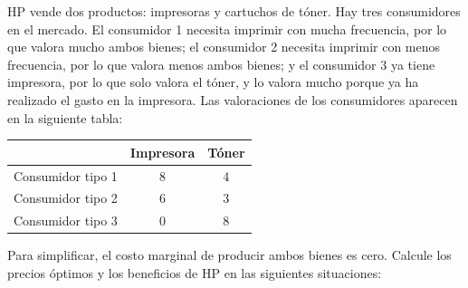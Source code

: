 \question HP vende dos productos: impresoras y cartuchos de tóner. Hay tres consumidores en el mercado. El consumidor 1 necesita imprimir con mucha frecuencia, por lo que valora mucho ambos bienes; el consumidor 2 necesita imprimir con menos frecuencia, por lo que valora menos ambos bienes; y el consumidor 3 ya tiene impresora, por lo que solo valora el tóner, y lo valora mucho porque ya ha realizado el gasto en la impresora. Las valoraciones de los consumidores aparecen en la siguiente tabla:
\begin{center}
\begin{tabular}{lcc}
  & Impresora & Tóner \\ \hline
  Consumidor tipo 1 & 8 & 4 \\
  Consumidor tipo 2 & 6 & 3 \\
  Consumidor tipo 3 & 0 & 8
\end{tabular}
\end{center}
Para simplificar, el costo marginal de producir ambos bienes es cero. Calcule los precios óptimos y los beneficios de HP en las siguientes situaciones:
